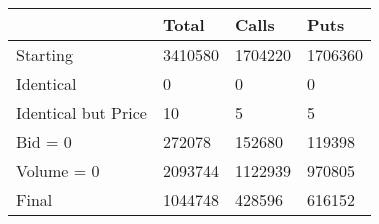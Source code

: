 \begin{tabular}{llll}
\toprule
 & Total & Calls & Puts \\
\midrule
Starting & 3410580 & 1704220 & 1706360 \\
Identical & 0 & 0 & 0 \\
Identical but Price & 10 & 5 & 5 \\
Bid = 0 & 272078 & 152680 & 119398 \\
Volume = 0 & 2093744 & 1122939 & 970805 \\
Final & 1044748 & 428596 & 616152 \\
\bottomrule
\end{tabular}
